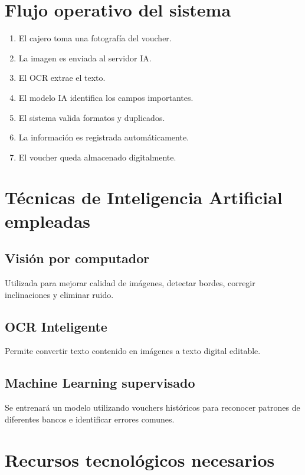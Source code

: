 \documentclass[12pt]{article}
\begin{document}
\section{Flujo operativo del sistema}

\begin{enumerate}
    \item El cajero toma una fotografía del voucher.
    \item La imagen es enviada al servidor IA.
    \item El OCR extrae el texto.
    \item El modelo IA identifica los campos importantes.
    \item El sistema valida formatos y duplicados.
    \item La información es registrada automáticamente.
    \item El voucher queda almacenado digitalmente.
\end{enumerate}

\section{Técnicas de Inteligencia Artificial empleadas}

\subsection{Visión por computador}

Utilizada para mejorar calidad de imágenes, detectar bordes, corregir inclinaciones y eliminar ruido.

\subsection{OCR Inteligente}

Permite convertir texto contenido en imágenes a texto digital editable.

\subsection{Machine Learning supervisado}

Se entrenará un modelo utilizando vouchers históricos para reconocer patrones de diferentes bancos e identificar errores comunes.

\section{Recursos tecnológicos necesarios}
\end{document}
